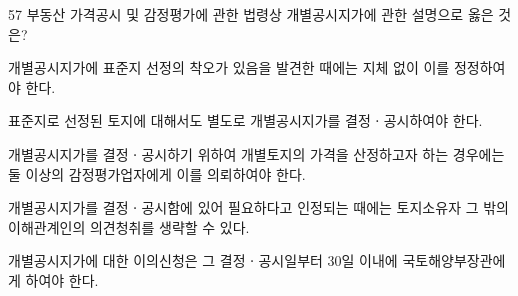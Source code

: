 \begin{question}{57}
부동산 가격공시 및 감정평가에 관한 법령상 개별공시지가에 관한 설명으로 옳은 것은?
\begin{choices}
  \item 개별공시지가에 표준지 선정의 착오가 있음을 발견한 때에는 지체 없이 이를 정정하여야 한다.
  \item 표준지로 선정된 토지에 대해서도 별도로 개별공시지가를 결정ㆍ공시하여야 한다.
  \item 개별공시지가를 결정ㆍ공시하기 위하여 개별토지의 가격을 산정하고자 하는 경우에는 둘 이상의 감정평가업자에게 이를 의뢰하여야 한다.
  \item 개별공시지가를 결정ㆍ공시함에 있어 필요하다고 인정되는 때에는 토지소유자 그 밖의 이해관계인의 의견청취를 생략할 수 있다.
  \item 개별공시지가에 대한 이의신청은 그 결정ㆍ공시일부터 30일 이내에 국토해양부장관에게 하여야 한다.
\end{choices}
\end{question}

